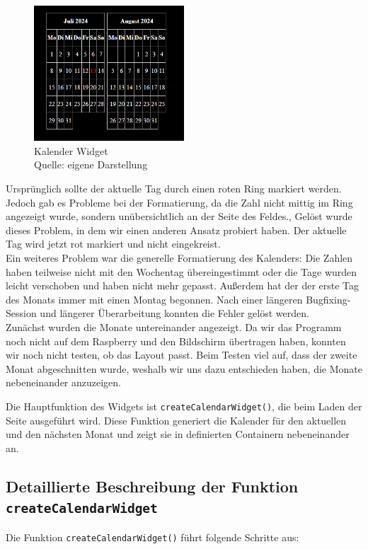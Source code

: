 \begin{figure}[h]
    \centering
    \includegraphics[width=0.5\textwidth]{pictures/calendar_widget.png}
  \captionsetup{justification=centering, labelformat=simple, singlelinecheck=false}
    \caption[Kalender Widget]{Kalender Widget\\ Quelle: eigene Darstellung}
\end{figure}

\noindent
Ursprünglich sollte der aktuelle Tag durch einen roten Ring markiert werden. Jedoch gab es Probleme bei der Formatierung, da die Zahl nicht mittig im Ring angezeigt wurde, sondern unübersichtlich an der Seite des Feldes., Gelöst wurde dieses Problem, in dem wir einen anderen Ansatz probiert haben. Der aktuelle Tag wird jetzt rot markiert und nicht eingekreist.\\
Ein weiteres Problem war die generelle Formatierung des Kalenders: Die Zahlen haben teilweise nicht mit den Wochentag übereingestimmt oder die Tage wurden leicht verschoben und haben nicht mehr gepasst. Außerdem hat der der erste Tag des Monats immer mit einen Montag begonnen. Nach einer längeren Bugfixing-Session und längerer Überarbeitung konnten die Fehler gelöst werden. \\
Zunächst wurden die Monate untereinander angezeigt. Da wir das Programm noch nicht auf dem Raspberry und den Bildschirm übertragen haben, konnten wir noch nicht testen, ob das Layout passt. Beim Testen viel auf, dass der zweite Monat abgeschnitten wurde, weshalb wir uns dazu entschieden haben, die Monate nebeneinander anzuzeigen.

\noindent
Die Hauptfunktion des Widgets ist \texttt{createCalendarWidget()}, die beim Laden der Seite ausgeführt wird. Diese Funktion generiert die Kalender für den aktuellen und den nächsten Monat und zeigt sie in definierten Containern nebeneinander an.

\subsection*{Detaillierte Beschreibung der Funktion \texttt{createCalendarWidget}}
Die Funktion \texttt{createCalendarWidget()} führt folgende Schritte aus:


